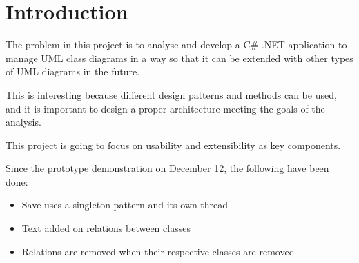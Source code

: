 \chapter{Introduction}
\label{sec:introduction}



The problem in this project is to analyse and develop a C\# .NET  application to manage UML class diagrams in a way so that it can be extended with other types of UML diagrams in the future.

This is interesting because different design patterns and methods can be used, and it is important to design a proper architecture meeting the goals of the analysis.





This project is going to focus on usability and extensibility as key components.


Since the prototype demonstration on December 12, the following have been done:

\begin{itemize}
  \item Save uses a singleton pattern and its own thread
  \item Text added on relations between classes
  \item Relations are removed when their respective classes are removed
\end{itemize}